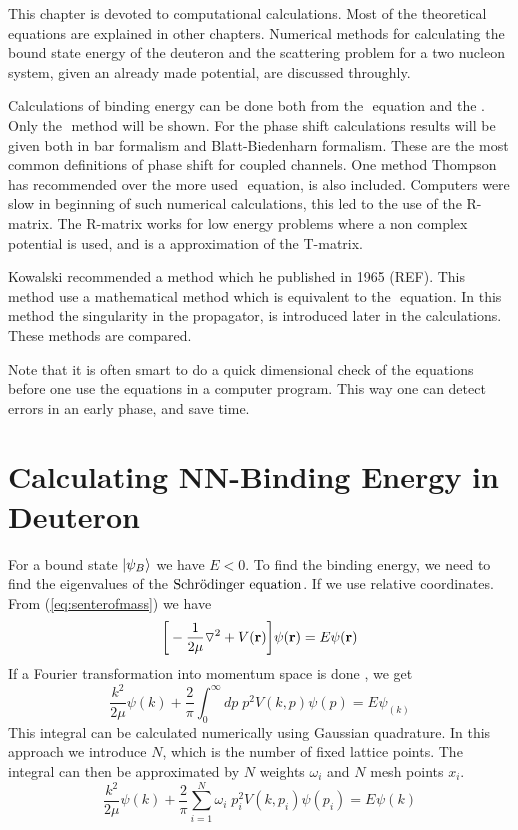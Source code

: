 \label{chap:Coputational Methods}

This chapter is devoted to computational calculations. Most of the theoretical equations are
explained in other chapters. Numerical methods for
calculating the bound state energy of the deuteron and the scattering problem
for a two nucleon system, given an already made potential,  are discussed throughly.

Calculations of binding energy can be done both from the \LS ${}$ equation and the \SE. Only the \SE${}$ 
method will be shown. For the phase shift calculations results will be given both in bar formalism and 
Blatt-Biedenharn formalism. These are the most common definitions of phase shift for coupled channels.
One method Thompson has recommended over the more used \LS ${}$ equation, is also included.
Computers were slow in beginning of such numerical calculations, this led to the use of the R-matrix. 
The R-matrix works for low energy problems where a non complex potential is used, and is a approximation
of the T-matrix.

Kowalski recommended a method which he published in 1965 (REF). This method use a mathematical method 
which is equivalent to the \LS ${}$ equation. In this method the singularity in the propagator, is introduced later
in the calculations. These methods are compared.

Note that it is often smart to do a quick dimensional check of the equations before one use the equations in a computer program.
This way one can detect errors in an early phase, and save time. 





\section{Calculating NN-Binding Energy in Deuteron} 

For a bound state $|\psi_B\rangle$ we have $E<0$. To find the binding energy, we need to find the eigenvalues of the
$\text{Schr$\ddot{\textrm{o}}$dinger equation}$. If we use relative coordinates. From (\ref{eq:senterofmass}) we have
\begin{equation}
\bigg[-\frac{1}{2\mu} {\bf \triangledown}^2+V({\bf r}) \bigg]\psi({\bf r})=E_{}\psi({\bf r})
\end{equation}
If a Fourier transformation into momentum space is done , we get
\begin{equation}
\frac{k^2}{2\mu}\psi({ k})+\frac{2}{\pi}\int^\infty_0 dp\;p^2 V({ k},{ p})\psi({ p})=E_{}\psi_({ k})  
\end{equation}
This integral can be calculated numerically using Gaussian quadrature. In this approach we introduce $N$, which is
the number of fixed lattice points. The integral can then be approximated by $N$ weights $\omega_i$ and $N$ mesh points $x_i$.
\begin{equation}
\frac{k^2}{2\mu}\psi({ k})+\frac{2}{\pi}\sum^N_{i=1}\omega_i\;p^2_i  V({ k},{ p_i})\psi({ p_i})=E_{}\psi({ k})
\end{equation}

